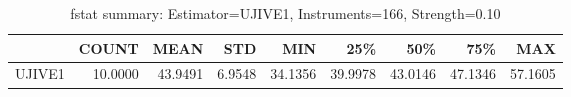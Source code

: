 \begin{table}[ht]
\centering
\caption{fstat summary: Estimator=UJIVE1, Instruments=166, Strength=0.10}
\begin{tabular}{lrrrrrrrr}
\toprule
 & COUNT & MEAN & STD & MIN & 25\% & 50\% & 75\% & MAX \\
\midrule
UJIVE1 & 10.0000 & 43.9491 & 6.9548 & 34.1356 & 39.9978 & 43.0146 & 47.1346 & 57.1605 \\
\bottomrule
\end{tabular}
\end{table}

